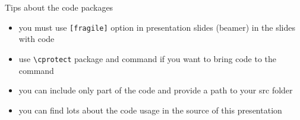 \begin{frame}[fragile]{Tips about the code packages\magicPage\preMagicPage}\relax
    \begin{itemize}
         \item you must use {\csk \verb|[fragile]|} option in presentation slides (beamer) in the slides with code 
         \item use {\csk \verb|\cprotect|} package and command if you want to bring code to the command
         \item you can include only part of the code and provide a path to your src folder
         \item you can find lots about the code usage in the source of this presentation  
    \end{itemize}
\end{frame}

